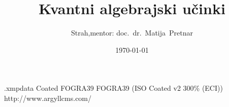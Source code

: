 \begin{filecontents*}[overwrite]{\jobname.xmpdata}
                     {Coated FOGRA39}
                     {FOGRA39 (ISO Coated v2 300\% (ECI))}
                     {http://www.argyllcms.com/}
\end{filecontents*}
\documentclass[a4paper,slovene]{article}
\usepackage[slovene]{babel}

\title{Kvantni algebrajski učinki}
\author{Strah,\quad mentor: doc.~dr.~Matija~Pretnar}
\date{\today}







\maketitle

\begin{abstract}

    Kvantni programski jeziki predstavljajo nove probleme za teorijo programskih jezikov,
    kot so linearnost tipov, (kvantni) fizikalni pojavi, in še mnogi drugi.
    V tej nalogi se bomo posvetili tema dvema.
    Naš cilj je razumeti, kako se kvantne programe,
    in dober način je razumevanje enakosti programov,
    tj. kdaj sta dva programa enaka?


    Najprej bomo predstavili algebrajsko teorijo za kvantne programe;
    ta je zgrajena na unitarnih vratih in meritvah ter ima linearne parametre.
    Nato bomo dokazali, da lahko s to teorijo predstavimo vse programe (polnost)
    in nato iz nje izpeljali pravila za enakost kvantnih programov.

\end{abstract}


